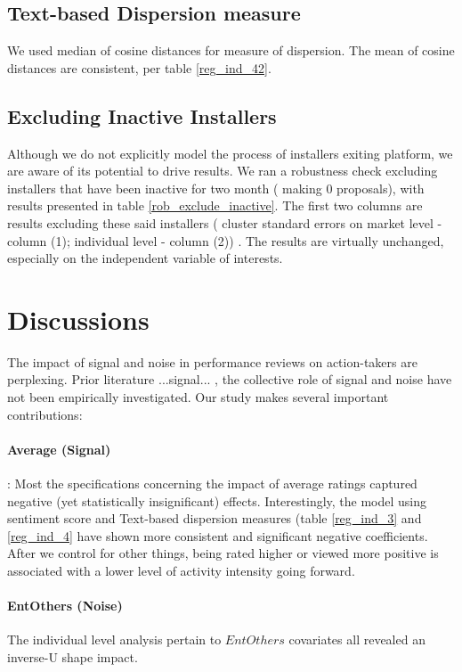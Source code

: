 \documentclass[msom,blindrev]{informs3}
\begin{document}
\subsection{Text-based Dispersion measure}

We used median of cosine distances for measure of dispersion. The mean of cosine distances are consistent, per table \ref{reg_ind_42}.
\subsection{Excluding Inactive Installers}
Although we do not explicitly model the process of installers exiting platform, we are aware of its potential to drive results. We ran a robustness check excluding installers that have been inactive for two month ( making 0 proposals), with results presented in table \ref{rob_exclude_inactive}. The first two columns are results excluding these said installers ( cluster standard errors on market level - column (1); individual level - column (2)) . The results are virtually unchanged, especially on the independent variable of interests.


\section{Discussions}
The impact of signal and noise in performance reviews on action-takers are perplexing. Prior literature ...signal... , the collective role of signal and noise have not been empirically investigated. Our study makes several important contributions:
\paragraph{Average (Signal)} : Most the specifications concerning the impact of average ratings captured negative (yet statistically insignificant) effects.   Interestingly, the model using sentiment score and Text-based dispersion measures (table \ref{reg_ind_3} and \ref{reg_ind_4} have shown more consistent and significant negative coefficients. After we control for other things, being rated higher or viewed more positive is associated with a lower level of activity intensity going forward. \\



\paragraph{EntOthers (Noise)} The individual level analysis pertain to $EntOthers$ covariates all revealed an inverse-U shape impact.
\end{document}
